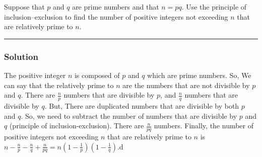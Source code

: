 \begin{question}
Suppose that $p$ and $q$ are prime numbers and that $n = pq$. Use the principle of inclusion–exclusion to find the number of positive integers not exceeding $n$ that are relatively prime to $n$.
\end{question}

\par\noindent\rule{\textwidth}{0.5pt}

\subsubsection*{Solution}

The positive integer $n$ is composed of $p$ and $q$ which are prime numbers. So, We can say that the relatively prime to $n$ are the numbers that are not divisible by $p$ and $q$. There are $\frac n p$ numbers that are divisible by $p$, and $\frac n q$ numbers that are divisible by $q$. But, There are duplicated numbers that are divisible by both $p$ and $q$. So, we need to subtract the number of numbers that are divisible by $p$ and $q$ (principle of inclusion-exclusion). There are $\frac n {pq}$ numbers. Finally, the number of positive integers not exceeding $n$ that are relatively prime to $n$ is $n - \frac n p - \frac n q + \frac n {pq} = n(1 - \frac 1 p)(1 - \frac 1 q)$.d